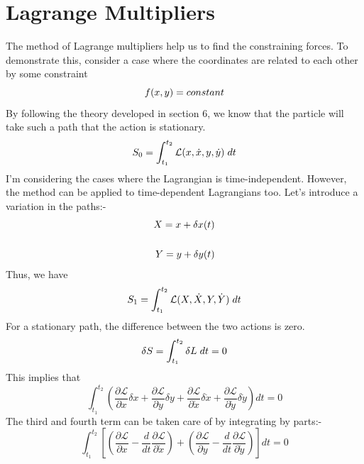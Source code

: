 \documentclass[12pt]{article}
\begin{document}
    \section{Lagrange Multipliers}
    The method of Lagrange multipliers help us to find the constraining forces. To demonstrate this,
    consider a case where the coordinates are related to each other by some constraint 
    \begin{equation}
        f(x,y)=constant \notag
    \end{equation}
    By following the theory developed in section 6, we know that the particle will take such a path that the action is stationary.
    \begin{equation}
        S_0=\int_{t_1}^{t_2}\mathcal{L}(x,\dot{x},y,\dot{y})\hspace{0.1cm}dt
    \end{equation}
    I'm considering the cases where the Lagrangian is time-independent. However, the method can be applied to time-dependent Lagrangians too.
    Let's introduce a variation in the paths:-
    \begin{align}
        X = x + \delta x(t) \\ \notag \\ Y = y + \delta y(t)
    \end{align}
    Thus, we have 
    \begin{equation}
        S_1=\int_{t_1}^{t_2}\mathcal{L}(X,\dot{X},Y,\dot{Y})\hspace{0.1cm}dt
    \end{equation}
    For a stationary path, the difference between the two actions is zero.
    \begin{equation}
        \delta S = \int_{t_1}^{t_2}\delta L \hspace{0.1cm}dt = 0
    \end{equation}
    This implies that
    \begin{equation}
        \int_{t_1}^{t_2}\left(\frac{\partial \mathcal{L}}{\partial x}\delta x +\frac{\partial \mathcal{L}}{\partial y}\delta y + \frac{\partial \mathcal{L}}{\partial \dot{x}}\delta \dot{x} + \frac{\partial \mathcal{L}}{\partial \dot{y}}\delta \dot{y}\right)dt=0
    \end{equation}
    The third and fourth term can be taken care of by integrating by parts:-
    \begin{equation}
        \int_{t_1}^{t_2}\left[\left(\frac{\partial \mathcal{L}}{\partial x}-\frac{d}{dt}\frac{\partial \mathcal{L}}{\partial \dot{x}}\right) + \left(\frac{\partial \mathcal{L}}{\partial y}-\frac{d}{dt}\frac{\partial \mathcal{L}}{\partial \dot{y}}\right)\right]dt=0
    \end{equation}
\end{document}
